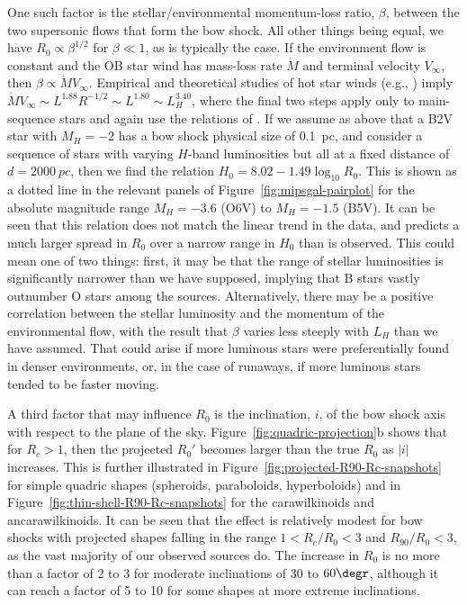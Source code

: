 One such factor is the stellar/environmental momentum-loss ratio,
\(\beta\), between the two supersonic flows that form the bow shock.  All
other things being equal, we have \(R_0 \propto \beta^{1/2}\) for
\(\beta \ll 1\), as is typically the case.  If the environment flow is
constant and the OB star wind has mass-loss rate \(\dot{M}\) and
terminal velocity \(V_\infty\), then
\(\beta \propto \dot{M}{V_\infty}\).  Empirical and theoretical studies of hot star
winds (e.g., \citealp{Puls:1996a}) imply
\(\dot{M}{V_\infty} \sim L^{1.88} R^{-1/2} \sim L^{1.80} \sim L_H^{3.40}\), where
the final two steps apply only to main-sequence stars and again use
the relations of \citet{Eker:2015a}.  If we assume as above that a B2V
star with \(M_H = -2\) has a bow shock physical size of \SI{0.1}{pc},
and consider a sequence of stars with varying \(H\)-band luminosities
but all at a fixed distance of \(d = \SI{2000}{pc}\), then we find the
relation \(H_0 = 8.02 - 1.49 \log_{10} R_0\).  This is shown as a
dotted line in the relevant panels of
Figure~\ref{fig:mipsgal-pairplot} for the absolute magnitude range
\(M_H = -3.6\) (O6V) to \(M_H = -1.5\) (B5V).  It can be seen that
this relation does not match the linear trend in the data, and
predicts a much larger spread in \(R_0\) over a narrow range in
\(H_0\) than is observed.  This could mean one of two things: first,
it may be that the range of stellar luminosities is significantly
narrower than we have supposed, implying that B stars vastly outnumber
O stars among the sources.  Alternatively, there may be a positive
correlation between the stellar luminosity and the momentum of the
environmental flow, with the result that \(\beta\) varies less steeply
with \(L_H\) than we have assumed.  That could arise if more luminous
stars were preferentially found in denser environments, or, in the
case of runaways, if more luminous stars tended to be faster moving.

A third factor that may influence \(R_0\) is the inclination, \(i\),
of the bow shock axis with respect to the plane of the sky.
Figure~\ref{fig:quadric-projection}b shows that for \(R_c > 1\), then
the projected \(R_0'\) becomes larger than the true \(R_0\) as \(|i|\)
increases.  This is further illustrated in
Figure~\ref{fig:projected-R90-Rc-snapshots} for simple quadric shapes
(spheroids, paraboloids, hyperboloids) and in
Figure~\ref{fig:thin-shell-R90-Rc-snapshots} for the carawilkinoids
and ancarawilkinoids.  It can be seen that the effect is relatively
modest for bow shocks with projected shapes falling in the range
\(1 < R_c/R_0 < 3\) and \(R_{90}/R_0 < 3\), as the vast majority of
our observed sources do.  The increase in \(R_0\) is no more than a
factor of 2 to 3 for moderate inclinations of \(30\) to \(60\degr\),
although it can reach a factor of 5 to 10 for some shapes at more
extreme inclinations.

